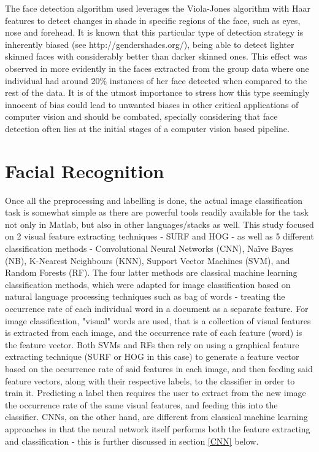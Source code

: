 \documentclass[11pt]{article}
\begin{document}
        \label{sec:face_labeling:outliers:difficulties}
            The face detection algorithm used leverages the Viola-Jones algorithm with Haar features to detect changes in shade in specific regions of the face, such as eyes, nose and forehead. It is known that this particular type of detection strategy is inherently biased (see http://gendershades.org/), being able to detect lighter skinned faces with considerably better than darker skinned ones. This effect was observed in more evidently in the faces extracted from the group data where one individual had around 20\% instances of her face detected when compared to the rest of the data. It is of the utmost importance to stress how this type seemingly innocent of bias could lead to unwanted biases in other critical applications of computer vision and should be combated, specially considering that face detection often lies at the initial stages of a computer vision based pipeline.



\section{Facial Recognition}
    Once all the preprocessing and labelling is done, the actual image classification task is somewhat simple as there are powerful tools readily available for the task not only in Matlab, but also in other languages/stacks as well. This study focused on 2 visual feature extracting techniques - SURF and HOG - as well as 5 different classification methods - Convolutional Neural Networks (CNN), Naïve Bayes (NB), K-Nearest Neighbours (KNN), Support Vector Machines (SVM), and Random Forests (RF). The four latter methods are classical machine learning classification methods, which were adapted for image classification based on natural language processing techniques such as bag of words - treating the occurrence rate of each individual word in a document as a separate feature. For image classification, "visual" words are used, that is a collection of visual features is extracted from each image, and the occurrence rate of each feature (word) is the feature vector. Both SVMs and RFs then rely on using a graphical feature extracting technique (SURF or HOG in this case) to generate a feature vector based on the occurrence rate of said features in each image, and then feeding said feature vectors, along with their respective labels, to the classifier in order to train it. Predicting a label then requires the user to extract from the new image the occurrence rate of the same visual features, and feeding this into the classifier. CNNs, on the other hand, are different from classical machine learning approaches in that the neural network itself performs both the feature extracting and classification - this is further discussed in section \ref{CNN} below.
\end{document}
